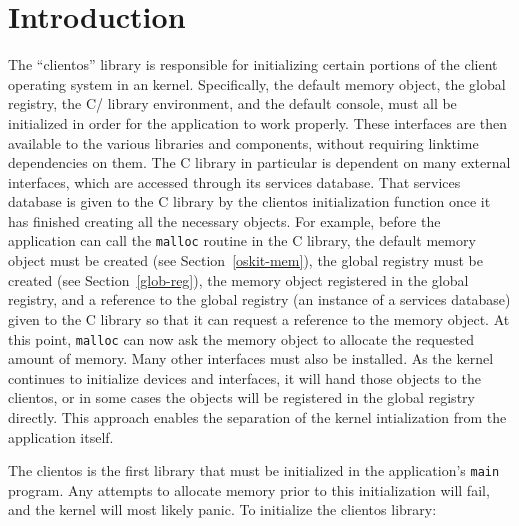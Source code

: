 %
% 
%
\label{clientos}

\section{Introduction}

The ``clientos'' library is responsible for initializing certain portions
of the client operating system in an \oskit{} kernel. Specifically, the
default memory object, the global registry, the C/\posix{} library
environment, and the default console, must all be initialized in order for
the application to work properly. These interfaces are then available to
the various \oskit{} libraries and components, without requiring linktime
dependencies on them.  The C library in particular is dependent on many
external interfaces, which are accessed through its services database. That
services database is given to the C library by the clientos initialization
function once it has finished creating all the necessary objects. For
example, before the application can call the \texttt{malloc} routine in the
C library, the default memory object must be created (see
Section~\ref{oskit-mem}),
the global registry must be created (see Section~\ref{glob-reg}), the memory
object registered in the global registry, and a
reference to the global registry (an instance of a services database) given
to the C library so that it can request a reference to the memory
object. At this point, \texttt{malloc} can now ask the memory object to
allocate the requested amount of memory. Many other interfaces must also be
installed. As the \oskit{} kernel continues to initialize devices and
interfaces, it will hand those objects to the clientos, or in some cases
the objects will be registered in the global registry directly. This
approach enables the separation of the kernel intialization from the
application itself.

The clientos is the first library that must be initialized in the
application's \texttt{main} program. Any attempts to allocate memory prior
to this initialization will fail, and the kernel will most likely panic.
To initialize the clientos library:

